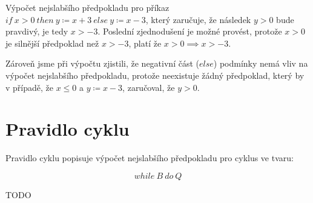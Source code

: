 Výpočet nejslabšího předpokladu pro příkaz $if \ x > 0 \ then \ y \coloneqq x + 3 \ else \ y \coloneqq x - 3$,
který zaručuje, že následek $y > 0$ bude pravdivý, je tedy $x > -3$.
Poslední zjednodušení je možné provést, protože $x > 0$ je silnější předpoklad než $x > -3$,
platí že $x > 0 \implies x > -3$.

Zároveň jsme při výpočtu zjistili, že negativní část ($else$) podmínky nemá vliv na výpočet nejslabšího předpokladu,
protože neexistuje žádný předpoklad, který by v případě, že $x \leq 0$ a $y \coloneqq x - 3$, zaručoval, že $y > 0$.

\section{Pravidlo cyklu}
\label{sec:pravidlo-cyklu}

Pravidlo cyklu popisuje výpočet nejslabšího předpokladu pro cyklus ve tvaru:

\begin{equation*}
    while \ B \ do \ Q
\end{equation*}

TODO

